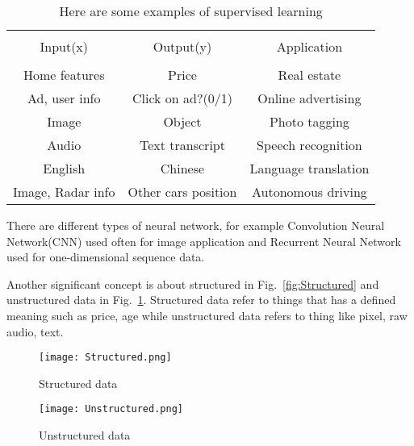 \documentclass[a4paper]{article}
\begin{document}
\begin{table}[hb]
    \centering
    \caption{Here are some examples of supervised learning}
    \begin{tabular}{|c|c|c|}
        \hline \\
        Input(x) & Output(y) & Application \\
        \hline \\
        Home features & Price & Real estate \\ \hline
		Ad, user info & Click on ad?(0/1) & Online advertising \\ 		\hline
		Image & Object & Photo tagging \\ \hline
		Audio & Text transcript & Speech recognition \\ \hline
		English & Chinese & Language translation \\ \hline
		Image, Radar info & Other cars position & Autonomous driving \\ \hline
    \end{tabular}
    \label{tab:Examples}
\end{table}

There are different types of neural network, for example Convolution Neural Network(CNN) used often for image application and Recurrent Neural Network used for one-dimensional sequence data.\par
Another significant concept is about structured in Fig.~\ref{fig:Structured} and unstructured data in Fig.~\ref{fig:Unstructured}. Structured data refer to things that has a defined meaning such as price, age while unstructured data refers to thing like pixel, raw audio, text.\par

\begin{figure}
\begin{minipage}[t]{0.5\linewidth}
\centering
\texttt{[image: Structured.png]}
\caption{Structured data~\cite{Coursera.org}}
\label{fig:Structured}
\end{minipage}%
\begin{minipage}[t]{0.5\linewidth}
\centering
\texttt{[image: Unstructured.png]}
\caption{Unstructured data~\cite{Coursera.org}}
\label{fig:Unstructured}
\end{minipage}
\end{figure}
\end{document}
